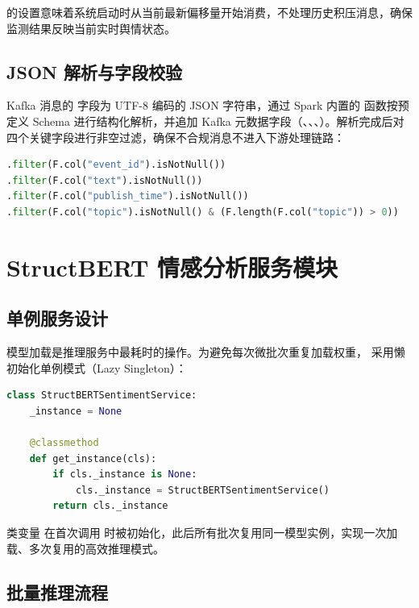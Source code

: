  的设置意味着系统启动时从当前最新偏移量开始消费，不处理历史积压消息，确保监测结果反映当前实时舆情状态。

\subsection{JSON 解析与字段校验}

Kafka 消息的  字段为 UTF-8 编码的 JSON 字符串，通过 Spark 内置的  函数按预定义  Schema 进行结构化解析，并追加 Kafka 元数据字段（、、、）。解析完成后对四个关键字段进行非空过滤，确保不合规消息不进入下游处理链路：

\begin{lstlisting}[language=Python, caption={关键字段非空过滤}, label={lst:filter}]
.filter(F.col("event_id").isNotNull())
.filter(F.col("text").isNotNull())
.filter(F.col("publish_time").isNotNull())
.filter(F.col("topic").isNotNull() & (F.length(F.col("topic")) > 0))
\end{lstlisting}

\section{StructBERT 情感分析服务模块}

\subsection{单例服务设计}

模型加载是推理服务中最耗时的操作。为避免每次微批次重复加载权重， 采用懒初始化单例模式（Lazy Singleton）：

\begin{lstlisting}[language=Python, caption={单例模式的情感分析服务}, label={lst:singleton}]
class StructBERTSentimentService:
    _instance = None

    @classmethod
    def get_instance(cls):
        if cls._instance is None:
            cls._instance = StructBERTSentimentService()
        return cls._instance
\end{lstlisting}

类变量  在首次调用  时被初始化，此后所有批次复用同一模型实例，实现一次加载、多次复用的高效推理模式。

\subsection{批量推理流程}


